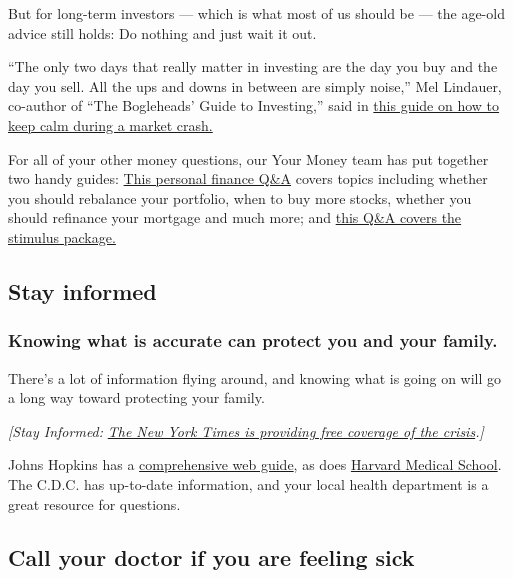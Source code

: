 But for long-term investors --- which is what most of us should be ---
the age-old advice still holds: Do nothing and just wait it out.

``The only two days that really matter in investing are the day you buy
and the day you sell. All the ups and downs in between are simply
noise,'' Mel Lindauer, co-author of ``The Bogleheads' Guide to
Investing,'' said in
\href{https://www.nytimes.com/2020/03/15/smarter-living/corona-stock-market-tips-dealing-with-financial-crash-crisis.html}{this
guide on how to keep calm during a market crash.}

For all of your other money questions, our Your Money team has put
together two handy guides:
\href{https://www.nytimes.com/article/coronavirus-money-advice.html}{This
personal finance Q\&A} covers topics including whether you should
rebalance your portfolio, when to buy more stocks, whether you should
refinance your mortgage and much more; and
\href{https://www.nytimes.com/article/coronavirus-stimulus-package-questions-answers.html}{this
Q\&A covers the stimulus package.}

\hypertarget{stay-informed}{%
\subsection{Stay informed}\label{stay-informed}}

\hypertarget{knowing-what-is-accurate-can-protect-you-and-your-family}{%
\subsubsection{Knowing what is accurate can protect you and your
family.}\label{knowing-what-is-accurate-can-protect-you-and-your-family}}

There's a lot of information flying around, and knowing what is going on
will go a long way toward protecting your family.

\emph{{[}Stay Informed:}
\href{https://www.nytimes.com/news-event/coronavirus?action=click\&module=Spotlight\&pgtype=Homepage}{\emph{The
New York Times is providing free coverage of the crisis}}\emph{.{]}}

Johns Hopkins has a \href{https://coronavirus.jhu.edu/}{comprehensive
web guide}, as does
\href{https://www.health.harvard.edu/diseases-and-conditions/coronavirus-resource-center}{Harvard
Medical School}. The C.D.C. has up-to-date information, and your local
health department is a great resource for questions.

\hypertarget{call-your-doctor-if-you-are-feeling-sick}{%
\subsection{Call your doctor if you are feeling
sick}\label{call-your-doctor-if-you-are-feeling-sick}}


